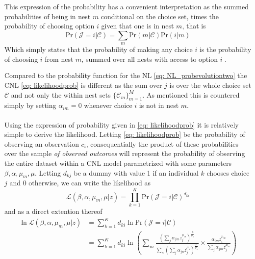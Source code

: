 This expression of the probability has a convenient interpretation as the summed probabilities of being in nest $m$ conditional on the choice set, times the probability of choosing option $i$ given that one is in nest $m$, that is
\begin{equation} \label{eq: CNL_conditional_probability}
\textrm{Pr}(\mathcal{J} = i | \mathcal{C})  = \sum_m \mathrm{Pr}(m|\mathcal{C}) \mathrm{Pr}(i|m)
\end{equation}
Which simply states that the probability of making any choice $i$ is the probability of choosing $i$ from nest $m$, summed over all nests with access to option $i$ \citep{bierlaire_theoretical_2006}.

Compared to the probability function for the NL \eqref{eq: NL_probevolutiontwo} the CNL \eqref{eq: likelihoodprob} is different as the sum over $j$ is over the whole choice set $\mathcal{C}$ and not only the within nest sets $\{\mathcal{C}_m\}_{m=1}^M$.  As mentioned this is countered simply by setting $\alpha_{im} = 0$ whenever choice $i$ is not in nest $m$.
\\ \\
Using the expression of probability given in \eqref{eq: likelihoodprob} it is relatively simple to derive the likelihood. Letting \eqref{eq: likelihoodprob} be the probability of observing an observation $c_i$, consequentially the product of these probabilities over the sample \textit{of observed outcomes} will represent the probability of observing the entire dataset within a CNL model parametrized with some parameters $\beta, \alpha, \mu_m, \mu$. Letting $d_{kj}$ be a dummy with value 1 if an individual $k$ chooses choice $j$ and $0$ otherwise, we can write the likelihood as
\begin{equation}
\mathcal{L}(\beta, \alpha, \mu_m, \mu | z) = \prod_{k=1}^K \textrm{Pr}(\mathcal{J} = i | \mathcal{C})^{d_{ki}}
\end{equation}
and as a direct extention thereof
\begin{equation}
\begin{split}
\ln \mathcal{L} (\beta, \alpha, \mu_m, \mu | z) &= \sum_{k=1}^K
d_{ki}
\ln \textrm{Pr}(\mathcal{J} = i | \mathcal{C})
\\
& = \sum_{k=1}^K d_{ki} \ln \left(
\sum_m
\frac{\left(
 \sum_j \alpha_{jm} z_j^{\mu_m} \right)^{\frac{\mu}{\mu_m}}}{\sum_n \left(
  \sum_j \alpha_{jn} z_j^{\mu_n} \right)^{\frac{\mu}{\mu_n}}
} \times
\frac{\alpha_{im}z_i^{\mu_m}}{\sum_j \alpha_{jm} z_j^{\mu_m}}
\right)
\end{split}
\end{equation}
